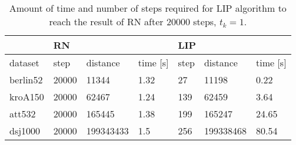 \begin{table}[!htb]
	\centering
	\begin{tabular}{|l|lll|lll|}
		\hline
		& \multicolumn{3}{l|}{RN}                                                    & \multicolumn{3}{l|}{LIP}                                                  \\ \hline
		dataset  & \multicolumn{1}{l|}{step}  & \multicolumn{1}{l|}{distance}  & time {[}s{]} & \multicolumn{1}{l|}{step} & \multicolumn{1}{l|}{distance}  & time {[}s{]} \\ \hline
		berlin52 & \multicolumn{1}{l|}{20000} & \multicolumn{1}{l|}{11344}     & 1.32         & \multicolumn{1}{l|}{27}   & \multicolumn{1}{l|}{11198}     & 0.22         \\ \hline
		kroA150  & \multicolumn{1}{l|}{20000} & \multicolumn{1}{l|}{62467}     & 1.24         & \multicolumn{1}{l|}{139}  & \multicolumn{1}{l|}{62459}     & 3.64         \\ \hline
		att532   & \multicolumn{1}{l|}{20000} & \multicolumn{1}{l|}{165445}    & 1.38         & \multicolumn{1}{l|}{199}  & \multicolumn{1}{l|}{165247}    & 24.65        \\ \hline
		dsj1000  & \multicolumn{1}{l|}{20000} & \multicolumn{1}{l|}{199343433} & 1.5          & \multicolumn{1}{l|}{256}  & \multicolumn{1}{l|}{199338468} & 80.54        \\ \hline
	\end{tabular}
	\caption{Amount of time and number of steps required for LIP algorithm to reach the result of RN after 20000 steps, $t_k=1$.}
	\label{tab:time_to_reach}
\end{table}